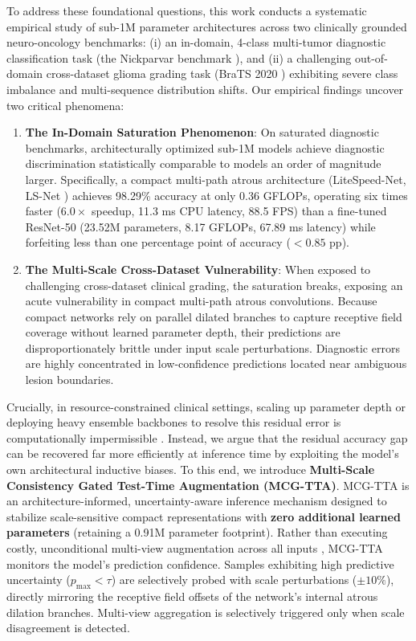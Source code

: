 ﻿\documentclass[journal]{IEEEtran}
\begin{document}
To address these foundational questions, this work conducts a systematic empirical study of sub-1M parameter architectures across two clinically grounded neuro-oncology benchmarks: (i) an in-domain, 4-class multi-tumor diagnostic classification task (the Nickparvar benchmark \cite{34}), and (ii) a challenging out-of-domain cross-dataset glioma grading task (BraTS 2020 \cite{2, 28}) exhibiting severe class imbalance and multi-sequence distribution shifts. Our empirical findings uncover two critical phenomena:
\begin{enumerate}
\item \textbf{The In-Domain Saturation Phenomenon}: On saturated diagnostic benchmarks, architecturally optimized sub-1M models achieve diagnostic discrimination statistically comparable to models an order of magnitude larger. Specifically, a compact multi-path atrous architecture (LiteSpeed-Net, LS-Net \cite{21}) achieves 98.29\% accuracy at only 0.36 GFLOPs, operating six times faster ($6.0\times$ speedup, 11.3 ms CPU latency, 88.5 FPS) than a fine-tuned ResNet-50 (23.52M parameters, 8.17 GFLOPs, 67.89 ms latency) while forfeiting less than one percentage point of accuracy ($<0.85$ pp).
\item \textbf{The Multi-Scale Cross-Dataset Vulnerability}: When exposed to challenging cross-dataset clinical grading, the saturation breaks, exposing an acute vulnerability in compact multi-path atrous convolutions. Because compact networks rely on parallel dilated branches to capture receptive field coverage without learned parameter depth, their predictions are disproportionately brittle under input scale perturbations. Diagnostic errors are highly concentrated in low-confidence predictions located near ambiguous lesion boundaries.
\end{enumerate}

Crucially, in resource-constrained clinical settings, scaling up parameter depth or deploying heavy ensemble backbones to resolve this residual error is computationally impermissible \cite{21, 41}. Instead, we argue that the residual accuracy gap can be recovered far more efficiently at inference time by exploiting the model's own architectural inductive biases. To this end, we introduce \textbf{Multi-Scale Consistency Gated Test-Time Augmentation (MCG-TTA)}. MCG-TTA is an architecture-informed, uncertainty-aware inference mechanism designed to stabilize scale-sensitive compact representations with \textbf{zero additional learned parameters} (retaining a 0.91M parameter footprint). Rather than executing costly, unconditional multi-view augmentation across all inputs \cite{4, 47}, MCG-TTA monitors the model's prediction confidence. Samples exhibiting high predictive uncertainty ($p_{\max} < \tau$) are selectively probed with scale perturbations ($\pm 10\%$), directly mirroring the receptive field offsets of the network's internal atrous dilation branches. Multi-view aggregation is selectively triggered only when scale disagreement is detected.
\end{document}

